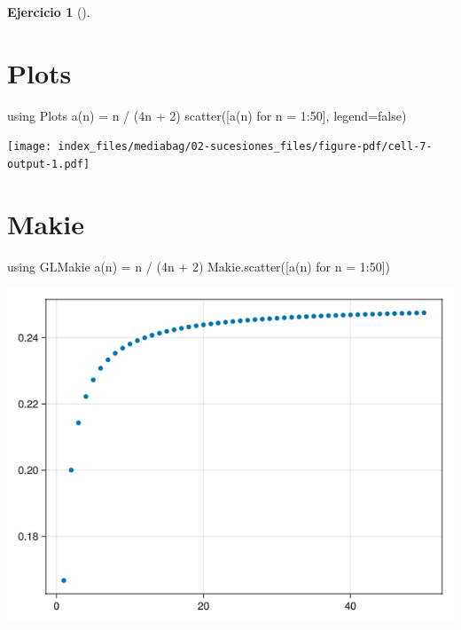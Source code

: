 \documentclass[
  a4paper,
]{scrreport}
\newenvironment{Shaded}{\begin{snugshade}}{\end{snugshade}}
\newcommand{\BuiltInTok}[1]{\textcolor[rgb]{0.00,0.23,0.31}{#1}}
\newcommand{\ConstantTok}[1]{\textcolor[rgb]{0.56,0.35,0.01}{#1}}
\newcommand{\FloatTok}[1]{\textcolor[rgb]{0.68,0.00,0.00}{#1}}
\newcommand{\FunctionTok}[1]{\textcolor[rgb]{0.28,0.35,0.67}{#1}}
\newcommand{\ImportTok}[1]{\textcolor[rgb]{0.00,0.46,0.62}{#1}}
\newcommand{\NormalTok}[1]{\textcolor[rgb]{0.00,0.23,0.31}{#1}}
\newcommand{\OperatorTok}[1]{\textcolor[rgb]{0.37,0.37,0.37}{#1}}
\theoremstyle{definition}
\newtheorem{exercise}{Ejercicio}[chapter]
\theoremstyle{remark}
\begin{document}
\begin{exercise}[]
\begin{enumerate}
\begin{tcolorbox}
  \section{Plots}

\begin{Shaded}
\begin{Highlighting}[]
\ImportTok{using} \BuiltInTok{Plots}
\FunctionTok{a}\NormalTok{(n) }\OperatorTok{=}\NormalTok{ n }\OperatorTok{/}\NormalTok{ (}\FloatTok{4}\NormalTok{n }\OperatorTok{+} \FloatTok{2}\NormalTok{)}
\FunctionTok{scatter}\NormalTok{([}\FunctionTok{a}\NormalTok{(n) for n }\OperatorTok{=} \FloatTok{1}\OperatorTok{:}\FloatTok{50}\NormalTok{], legend}\OperatorTok{=}\ConstantTok{false}\NormalTok{)}
\end{Highlighting}
\end{Shaded}

  \texttt{[image: index\_files/mediabag/02-sucesiones\_files/figure-pdf/cell-7-output-1.pdf]}

  \section{Makie}

\begin{Shaded}
\begin{Highlighting}[]
\ImportTok{using} \BuiltInTok{GLMakie}
\FunctionTok{a}\NormalTok{(n) }\OperatorTok{=}\NormalTok{ n }\OperatorTok{/}\NormalTok{ (}\FloatTok{4}\NormalTok{n }\OperatorTok{+} \FloatTok{2}\NormalTok{)}
\NormalTok{Makie.}\FunctionTok{scatter}\NormalTok{([}\FunctionTok{a}\NormalTok{(n) for n }\OperatorTok{=} \FloatTok{1}\OperatorTok{:}\FloatTok{50}\NormalTok{])}
\end{Highlighting}
\end{Shaded}

  \includegraphics{02-sucesiones_files/figure-pdf/cell-8-output-1.png}


\end{tcolorbox}
\end{enumerate}
\end{exercise}
\end{document}
